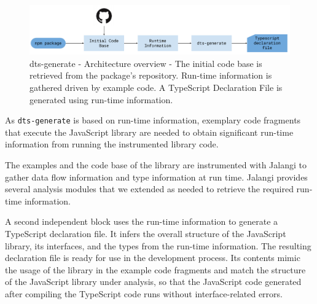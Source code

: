 \documentclass[sigconf]{acmart}
\begin{document}

\begin{figure}[tp]
  \centering
  \includegraphics[width=1\linewidth]{dts-generate-block-diagram.pdf}
  \caption[dts-generate - Architecture overview]{dts-generate - Architecture
      overview - The initial code base is retrieved from the \NPM{} package's
    repository.
    Run-time information is gathered driven by example code.
    A TypeScript Declaration File is generated using run-time
    information.
  } 
  \label{fig:tsd_generation_method_block_diagram}
\end{figure}

As \texttt{dts-generate} is based on run-time information, 
exemplary code fragments that execute the JavaScript library are
needed to obtain 
significant run-time information from running the instrumented library
code.


The examples and the code base of the library are instrumented with
Jalangi \cite{DBLP:conf/sigsoft/SenKBG13} to gather data flow
information and type information at run time. Jalangi provides several
analysis modules that we extended as needed to retrieve the required
run-time information.

A second independent block uses the run-time information to generate a
TypeScript declaration file. It infers the overall structure of the JavaScript
library, its interfaces, and the types from the run-time information. 
The resulting declaration file is ready for use in the development
process. Its contents mimic the usage of the library in the example
code fragments and match the structure of the
JavaScript library under analysis, so that the JavaScript code
generated after compiling the TypeScript code runs without
interface-related errors.
\end{document}
